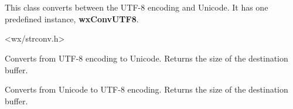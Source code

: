 %
%


\section{}\label{wxmbconvutf8}

This class converts between the UTF-8 encoding and Unicode.
It has one predefined instance, {\bf wxConvUTF8}.




<wx/strconv.h>





\label{wxmbconvutf8mb2wc}


Converts from UTF-8 encoding to Unicode. Returns the size of the destination buffer.

\label{wxmbconvutf8wc2mb}


Converts from Unicode to UTF-8 encoding. Returns the size of the destination buffer.
